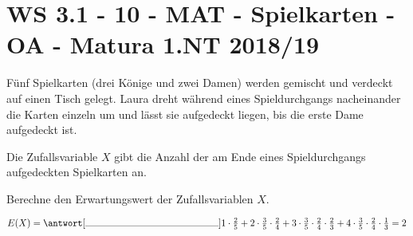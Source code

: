 \section{WS 3.1 - 10 - MAT - Spielkarten - OA - Matura 1.NT 2018/19}

\begin{beispiel}[WS 3.1]{1}
Fünf Spielkarten (drei Könige und zwei Damen) werden gemischt und verdeckt auf einen Tisch gelegt. Laura dreht während eines Spieldurchgangs nacheinander die Karten einzeln um und lässt sie aufgedeckt liegen, bis die erste Dame aufgedeckt ist.

Die Zufallsvariable $X$ gibt die Anzahl der am Ende eines Spieldurchgangs aufgedeckten Spielkarten an.

Berechne den Erwartungswert der Zufallsvariablen $X$.\leer

$E(X)=\antwort[\rule{5cm}{0.3pt}]{1\cdot\frac{2}{5}+2\cdot\frac{3}{5}\cdot\frac{2}{4}+3\cdot\frac{3}{5}\cdot\frac{2}{4}\cdot\frac{2}{3}+4\cdot\frac{3}{5}\cdot\frac{2}{4}\cdot\frac{1}{3}=2}$
\end{beispiel}
